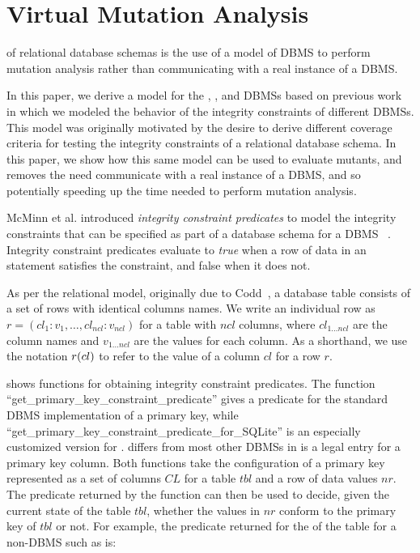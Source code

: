 


\vspace{-1ex}
\section{Virtual Mutation Analysis}
\label{sec:virtual-mutation-analysis}
\VMA of relational database schemas is the use of a model of DBMS to perform mutation analysis rather than communicating with a real instance of a DBMS.

In this paper, we derive a model for the \HyperSQL, \Postgres, and \SQLite DBMSs based on previous work \cite{McMinn2015} in which we modeled the behavior of the integrity constraints of different DBMSs. This model was originally motivated by the desire to derive different coverage criteria for testing the integrity constraints of a relational database schema. In this paper, we show how this same model can be used to evaluate mutants, and removes the need communicate with a real instance of a DBMS, and so potentially speeding up the time needed to perform mutation analysis.



McMinn et al. introduced {\it integrity constraint predicates} to model the integrity constraints that can be specified as part of a database schema for a DBMS~\cite{McMinn2015} . Integrity constraint predicates evaluate to {\it true} when a row of data in an \INSERT statement satisfies the constraint, and false when it does not.

As per the relational model, originally due to Codd~\cite{Codd1970}, a database table consists of a set of rows with identical columns names. We write an individual row as $r = (cl_1:v_1, \dots, cl_{ncl}:v_{ncl})$ for a table with $ncl$ columns, where $cl_{1 \ldots ncl}$ are the column names and $v_{1 \ldots ncl}$ are the values for each column. As a shorthand, we use the notation $r (cl)$ to refer to the value of a column $cl$ for a row $r$.

\begin{sloppypar}
 shows functions for obtaining integrity constraint predicates. The function
``get\_primary\_key\_constraint\_predicate'' gives a predicate for the standard DBMS implementation of a primary key,
while ``get\_primary\_key\_constraint\_predicate\_for\_SQLite'' is an especially customized version for \SQLite. \SQLite
differs from most other DBMSs in \NULL is a legal entry for a primary key column. Both functions take the
configuration of a primary key represented as a set of columns $CL$ for a table $tbl$ and a row of data values $nr$. The
predicate returned by the function can then be used to decide, given the current state of the table $tbl$, whether the
values in $nr$ conform to the primary key of $tbl$ or not. For example, the predicate returned for the \PK of the
 table for a non-\SQLite DBMS such as \Postgres is:
\end{sloppypar}

